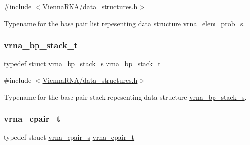 {\ttfamily \#include $<$\mbox{\hyperlink{data__structures_8h}{Vienna\+R\+N\+A/data\+\_\+structures.\+h}}$>$}



Typename for the base pair list repesenting data structure \mbox{\hyperlink{group__struct__utils_structvrna__elem__prob__s}{vrna\+\_\+elem\+\_\+prob\+\_\+s}}. 

\mbox{\label{group__data__structures_gaa651bda42e7692f08cb603cd6834b0ee}} 
\subsubsection{\texorpdfstring{vrna\+\_\+bp\+\_\+stack\+\_\+t}{vrna\_bp\_stack\_t}}
{\footnotesize\ttfamily typedef struct \mbox{\hyperlink{group__data__structures_structvrna__bp__stack__s}{vrna\+\_\+bp\+\_\+stack\+\_\+s}} \mbox{\hyperlink{group__data__structures_gaa651bda42e7692f08cb603cd6834b0ee}{vrna\+\_\+bp\+\_\+stack\+\_\+t}}}



{\ttfamily \#include $<$\mbox{\hyperlink{data__structures_8h}{Vienna\+R\+N\+A/data\+\_\+structures.\+h}}$>$}



Typename for the base pair stack repesenting data structure \mbox{\hyperlink{group__data__structures_structvrna__bp__stack__s}{vrna\+\_\+bp\+\_\+stack\+\_\+s}}. 

\mbox{\label{group__data__structures_gae4fc91141cc69c6d8eaf1332cb991ecc}} 
\subsubsection{\texorpdfstring{vrna\+\_\+cpair\+\_\+t}{vrna\_cpair\_t}}
{\footnotesize\ttfamily typedef struct \mbox{\hyperlink{group__data__structures_structvrna__cpair__s}{vrna\+\_\+cpair\+\_\+s}} \mbox{\hyperlink{group__data__structures_gae4fc91141cc69c6d8eaf1332cb991ecc}{vrna\+\_\+cpair\+\_\+t}}}



